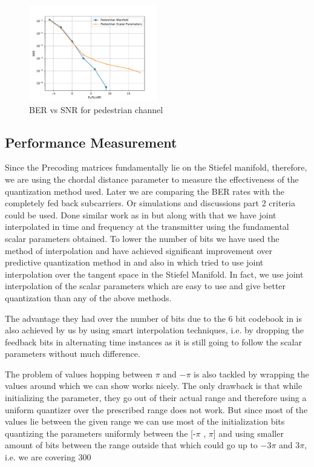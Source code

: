 \documentclass[conference]{IEEEtran}
\begin{document}
\begin{figure}
\includegraphics[width=0.5\textwidth]{images/pedestrian.pdf}
\caption{BER vs SNR for pedestrian channel}
\label{ber_overview}
\vspace{-5pt}
\end{figure}

\subsection{Performance Measurement}

\label{setting}



\noindent Since the Precoding matrices fundamentally lie on the Stiefel manifold, therefore, we are using the chordal distance parameter to measure the effectiveness of the quantization method used. Later we are comparing the BER rates with the completely fed back subcarriers. Or simulations and discussions part 2 criteria could be used. Done similar work as in \cite{4114278} but along with that we have joint interpolated in time and frequency at the transmitter using the fundamental scalar parameters obtained. To lower the number of bits we have used the method of interpolation and have achieved significant improvement over predictive quantization method in \cite{6891198} and also in \cite{Gupt1905:Predictive} which tried to use joint interpolation over the tangent space in the Stiefel Manifold. In fact, we use joint interpolation of the scalar parameters which are easy to use and give better quantization than any of the above methods.

The advantage they had over the number of bits due to the 6 bit codebook in \cite{6891198,Gupt1905:Predictive} is also achieved by us by using smart interpolation techniques, i.e. by dropping the feedback bits in alternating time instances as it is still going to follow the scalar parameters without much difference.

The problem of values hopping between $\pi$ and $-\pi$ is also tackled by wrapping the values around which we can show works nicely. The only drawback is that while initializing the parameter, they go out of their actual range and therefore using a uniform quantizer over the prescribed range does not work. But since most of the values lie between the given range we can use most of the initialization bits quantizing the parameters uniformly between the [-$\pi$ , $\pi$] and using smaller amount of bits between the range outside that which could go up to $-3\pi$ and $3\pi$, i.e. we are covering 300%
\end{document}
